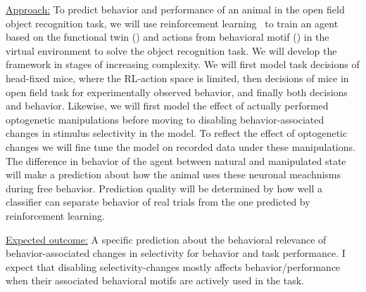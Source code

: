 \documentclass[COG,11pt]{ercgrant}
\begin{document}
\underline{Approach:} 
To predict behavior and performance of an animal in the open field object recognition task, we will use reinforcement learning~\parencite[RL,][]{Cobbe2021-op} to train an agent based on the functional twin () and actions from behavioral motif () in the virtual environment to solve the object recognition task.
We will develop the framework in stages of increasing complexity.
We will first model task decisions of head-fixed mice, where the RL-action space is limited, 
then decisions of mice in open field task for experimentally observed behavior, and finally both decisions and behavior. 
Likewise, we will first model the effect of actually performed optogenetic manipulations before moving to disabling behavior-associated changes in stimulus selectivity in the model. 
To reflect the effect of optogenetic changes we will fine tune the model on recorded data under these manipulations. 
The difference in behavior of the agent between natural and manipulated state will make a prediction about how the animal uses these neuronal meachnisms during free behavior.
Prediction quality will be determined by how well a classifier can separate behavior of real trials from the one predicted by reinforcement learning. 


\underline{Expected outcome:} 
A specific prediction about the behavioral relevance of behavior-associated changes in selectivity for behavior and task performance. %
I expect that disabling selectivity-changes mostly affects behavior/performance when their associated behavioral motifs are actively used in the task.
\end{document}
